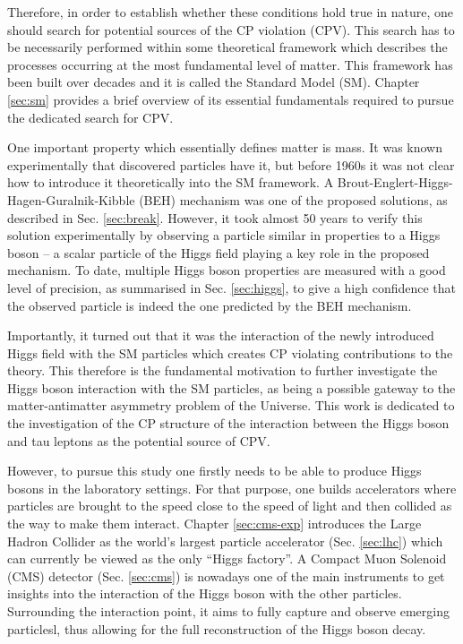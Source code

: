 Therefore, in order to establish whether these conditions hold true in nature, one should search for potential sources of the CP violation (CPV). This search has to be necessarily performed within some theoretical framework which describes the processes occurring at the most fundamental level of matter. This framework has been built over decades and it is called the Standard Model (SM). Chapter \ref{sec:sm} provides a brief overview of its essential fundamentals required to pursue the dedicated search for CPV. 

One important property which essentially defines matter is mass. It was known experimentally that discovered particles have it, but before 1960s it was not clear how to introduce it theoretically into the SM framework. A Brout-Englert-Higgs-Hagen-Guralnik-Kibble (BEH) mechanism was one of the proposed solutions, as described in Sec. \ref{sec:break}. However, it took almost 50 years to verify this solution experimentally by observing a particle similar in properties to a Higgs boson -- a scalar particle of the Higgs field playing a key role in the proposed mechanism. To date, multiple Higgs boson properties are measured with a good level of precision, as summarised in Sec. \ref{sec:higgs}, to give a high confidence that the observed particle is indeed the one predicted by the BEH mechanism. 

Importantly, it turned out that it was the interaction of the newly introduced Higgs field with the SM particles which creates CP violating contributions to the theory. This therefore is the fundamental motivation to further investigate the Higgs boson interaction with the SM particles, as being a possible gateway to the matter-antimatter asymmetry problem of the Universe. This work is dedicated to the investigation of the CP structure of the interaction between the Higgs boson and tau leptons as the potential source of CPV.  

However, to pursue this study one firstly needs to be able to produce Higgs bosons in the laboratory settings. For that purpose, one builds accelerators where particles are brought to the speed close to the speed of light and then collided as the way to make them interact. Chapter \ref{sec:cms-exp} introduces the Large Hadron Collider as the world’s largest particle accelerator (Sec. \ref{sec:lhc}) which can currently be viewed as the only \enquote{Higgs factory}. A Compact Muon Solenoid (CMS) detector (Sec. \ref{sec:cms}) is nowadays one of the main instruments to get insights into the interaction of the Higgs boson with the other particles. Surrounding the interaction point, it aims to fully capture and observe emerging particlesl, thus allowing for the full reconstruction of the Higgs boson decay.

